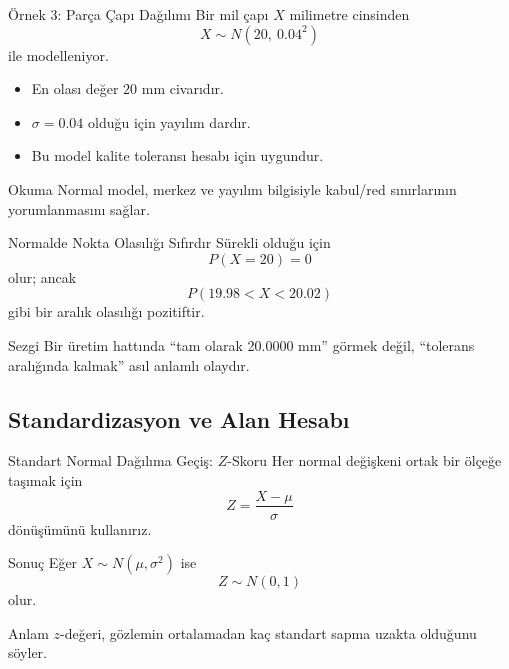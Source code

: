 \documentclass[light]{lutbeamer}
\begin{document}
\begin{frame}{Örnek 3: Parça Çapı Dağılımı}
    \small
    Bir mil çapı \(X\) milimetre cinsinden
    \[
    X \sim N(20,\ 0.04^2)
    \]
    ile modelleniyor.

    \begin{itemize}
        \item En olası değer \(20\) mm civarıdır.
        \item \(\sigma=0.04\) olduğu için yayılım dardır.
        \item Bu model kalite toleransı hesabı için uygundur.
    \end{itemize}

    \begin{alertblock}{Okuma}
        Normal model, merkez ve yayılım bilgisiyle kabul/red sınırlarının yorumlanmasını sağlar.
    \end{alertblock}
\end{frame}

\begin{frame}{Normalde Nokta Olasılığı Sıfırdır}
    \small
    Sürekli olduğu için
    \[
    P(X=20)=0
    \]
    olur; ancak
    \[
    P(19.98<X<20.02)
    \]
    gibi bir aralık olasılığı pozitiftir.

    \begin{block}{Sezgi}
        Bir üretim hattında ``tam olarak 20.0000 mm'' görmek değil,
        ``tolerans aralığında kalmak'' asıl anlamlı olaydır.
    \end{block}
\end{frame}

\subsection{Standardizasyon ve Alan Hesabı}

\begin{frame}{Standart Normal Dağılıma Geçiş: \(Z\)-Skoru}
    \small
    Her normal değişkeni ortak bir ölçeğe taşımak için
    \[
    Z=\frac{X-\mu}{\sigma}
    \]
    dönüşümünü kullanırız.

    \begin{block}{Sonuç}
        Eğer \(X \sim N(\mu,\sigma^2)\) ise
        \[
        Z \sim N(0,1)
        \]
        olur.
    \end{block}

    \begin{alertblock}{Anlam}
        \(z\)-değeri, gözlemin ortalamadan kaç standart sapma uzakta olduğunu söyler.
    \end{alertblock}
\end{frame}
\end{document}
